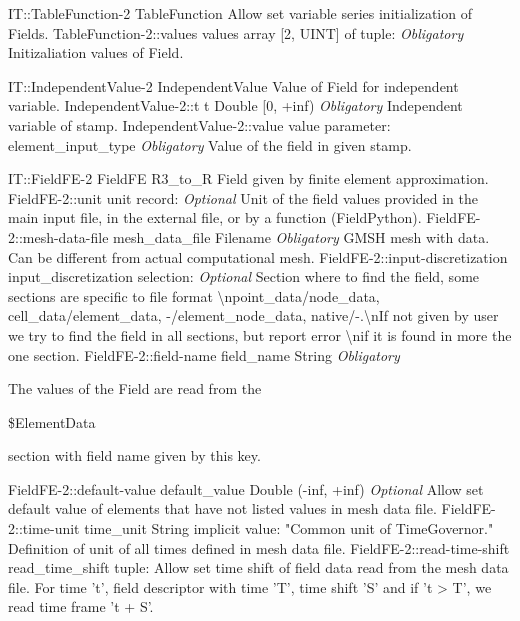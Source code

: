\begin{RecordType}
	{IT::TableFunction-2}
	{TableFunction}
	{}%
	{}%
	{{{Allow set variable series initialization of Fields.}%
}}
		\RecKey
			{TableFunction-2::values}
			{values}
			{{array [2, UINT] of }{tuple: }}{}
			{ \it{Obligatory}}
			{{{Initizaliation values of Field.}%
}}
\end{RecordType}
\begin{TupleType}
	{IT::IndependentValue-2}
	{IndependentValue}
	{}%
	{}%
	{{{Value of Field for independent variable.}%
}}
		\RecKey
			{IndependentValue-2::t}
			{t}
			{{Double [0, +inf)}}{}
			{ \it{Obligatory}}
			{{{Independent variable of stamp.}%
}}
		\RecKey
			{IndependentValue-2::value}
			{value}
			{{parameter: element{\_}input{\_}type}}{}
			{ \it{Obligatory}}
			{{{Value of the field in given stamp.}%
}}
\end{TupleType}
\begin{RecordType}
	{IT::FieldFE-2}
	{FieldFE}
	{}%
	{}%
	{{{R3{\_}to{\_}R Field given by finite element approximation.}%
}}
		\RecKey
			{FieldFE-2::unit}
			{unit}
			{{record: }}{}
			{ \it{Optional}}
			{{{Unit of the field values provided in the main input file, in the external file, or by a function (FieldPython).}%
}}
		\RecKey
			{FieldFE-2::mesh-data-file}
			{mesh{\_}data{\_}file}
			{{Filename}}{}
			{ \it{Obligatory}}
			{{{GMSH mesh with data.
Can be different from actual computational mesh.}%
}}
		\RecKey
			{FieldFE-2::input-discretization}
			{input{\_}discretization}
			{{selection: }}{}
			{ \it{Optional}}
			{{{Section where to find the field, some sections are specific to file format {\textbackslash}npoint{\_}data/node{\_}data, cell{\_}data/element{\_}data, -/element{\_}node{\_}data, native/-.{\textbackslash}nIf not given by user we try to find the field in all sections, but report error {\textbackslash}nif it is found in more the one section.}%
}}
		\RecKey
			{FieldFE-2::field-name}
			{field{\_}name}
			{{String}}{}
			{ \it{Obligatory}}
			{{{The values of the Field are read from the }\begin{ttfamily}{\$}ElementData\end{ttfamily}{ section with field name given by this key.}%
}}
		\RecKey
			{FieldFE-2::default-value}
			{default{\_}value}
			{{Double (-inf, +inf)}}{}
			{ \it{Optional}}
			{{{Allow set default value of elements that have not listed values in mesh data file.}%
}}
		\RecKey
			{FieldFE-2::time-unit}
			{time{\_}unit}
			{{String}}{}
			{implicit value: "{Common unit of TimeGovernor.}"}
			{{{Definition of unit of all times defined in mesh data file.}%
}}
		\RecKey
			{FieldFE-2::read-time-shift}
			{read{\_}time{\_}shift}
			{{tuple: }}{}
			{ }
			{{{Allow set time shift of field data read from the mesh data file.
For time 't', field descriptor with time 'T', time shift 'S' and if 't {\textgreater} T', we read time frame 't + S'.}%
}}
\end{RecordType}

